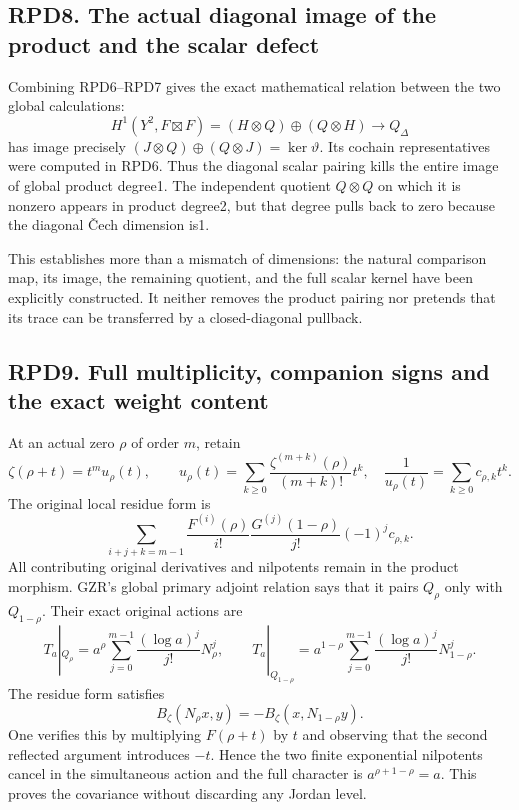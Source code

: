 \subsection{RPD8. The actual diagonal image of the product and the
scalar
defect}\label{rpd8.-the-actual-diagonal-image-of-the-product-and-the-scalar-defect}

Combining RPD6--RPD7 gives the exact mathematical relation between the
two global calculations: \[
H^1(Y^2,F\boxtimes F)
=(H\otimes Q)\oplus(Q\otimes H)
\longrightarrow Q_\Delta
\] has image precisely \((J\otimes Q)\oplus(Q\otimes J)=\ker\vartheta\).
Its cochain representatives were computed in RPD6. Thus the diagonal
scalar pairing kills the entire image of global product degree1. The
independent quotient \(Q\otimes Q\) on which it is nonzero appears in
product degree2, but that degree pulls back to zero because the diagonal
Čech dimension is1.

This establishes more than a mismatch of dimensions: the natural
comparison map, its image, the remaining quotient, and the full scalar
kernel have been explicitly constructed. It neither removes the product
pairing nor pretends that its trace can be transferred by a
closed-diagonal pullback.

\subsection{RPD9. Full multiplicity, companion signs and the exact
weight
content}\label{rpd9.-full-multiplicity-companion-signs-and-the-exact-weight-content}

At an actual zero \(\rho\) of order \(m\), retain \[
\zeta(\rho+t)=t^m u_\rho(t),\qquad
u_\rho(t)=\sum_{k\ge0}\frac{\zeta^{(m+k)}(\rho)}{(m+k)!}t^k,
\quad
\frac1{u_\rho(t)}=\sum_{k\ge0}c_{\rho,k}t^k.
\] The original local residue form is \[
\sum_{i+j+k=m-1}
\frac{F^{(i)}(\rho)}{i!}
\frac{G^{(j)}(1-\rho)}{j!}
(-1)^j c_{\rho,k}.
\tag{RPD9.1}
\] All contributing original derivatives and nilpotents remain in the
product morphism. GZR's global primary adjoint relation says that it
pairs \(Q_\rho\) only with \(Q_{1-\rho}\). Their exact original actions
are \[
T_a|_{Q_\rho}=a^\rho
\sum_{j=0}^{m-1}\frac{(\log a)^j}{j!}N_\rho^j,\qquad
T_a|_{Q_{1-\rho}}=a^{1-\rho}
\sum_{j=0}^{m-1}\frac{(\log a)^j}{j!}N_{1-\rho}^j.
\tag{RPD9.2}
\] The residue form satisfies \[
B_\zeta(N_\rho x,y)=-B_\zeta(x,N_{1-\rho}y).
\tag{RPD9.3}
\] One verifies this by multiplying \(F(\rho+t)\) by \(t\) and observing
that the second reflected argument introduces \(-t\). Hence the two
finite exponential nilpotents cancel in the simultaneous action and the
full character is \(a^{\rho+1-\rho}=a\). This proves the covariance
without discarding any Jordan level.

